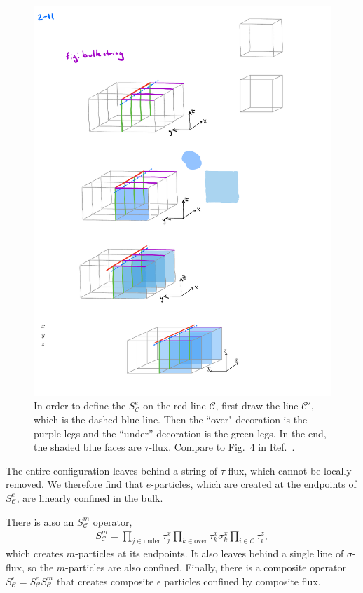 \documentclass[twocolumn, longbibliography]{revtex4-2}
\newcommand{\C}{\mathcal{C}}
\begin{document}
\begin{figure}
\centering
\includegraphics{bulkstring}
\caption{In order to define the $S_\C^e$ on the red line $\C$, first draw the line $\C'$, which is the dashed blue line. Then the ``over" decoration is the purple legs and the ``under'' decoration is the green legs. In the end, the shaded blue faces are $\tau$-flux. Compare to Fig.~4 in Ref.~\cite{BurnellSoluble}.}
\label{fig:bulkstring}
\end{figure}

The entire configuration leaves behind a string of $\tau$-flux, which cannot be locally removed. We therefore find that $e$-particles, which are created at the endpoints of $S^e_\C$, are linearly confined in the bulk.

There is also an $S^m_\mathcal{C}$ operator,
\begin{align}
S^m_\mathcal{C} = \prod_{j\in\text{under}} \tau^x_j  \prod_{k\in\text{over}} \tau^x_k \sigma^x_k \prod_{i\in\mathcal{C}}\tau^z_i,
\end{align}
which creates $m$-particles at its endpoints. It also leaves behind a single line of $\sigma$-flux, so the $m$-particles are also confined. Finally, there is a composite operator $S^\epsilon_\C=S^e_\C S^m_\C$ that creates composite $\epsilon$ particles confined by composite flux.
	
\end{document}
